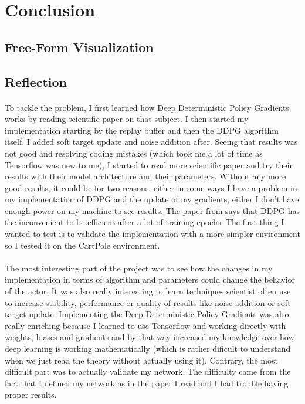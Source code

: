 \documentclass{article}
\begin{document}
\section{Conclusion}

\subsection{Free-Form Visualization}

\subsection{Reflection}

\paragraph{}
To tackle the problem, I first learned how Deep Deterministic Policy Gradients works by reading
scientific paper on that subject. I then started my implementation starting by the replay buffer
and then the DDPG algorithm itself. I added soft target update and noise addition after. Seeing
that results was not good and resolving coding mistakes (which took me a lot of time as Tensorflow
was new to me), I started to read more scientific paper and try their results with their model
architecture and their parameters. Without any more good results, it could be for two reasons:
either in some ways I have a problem in my implementation of DDPG and the update of my gradients,
either I don't have enough power on my machine to see results. The paper from
\citeauthor{journals/corr/LillicrapHPHETS15} says that DDPG has the inconvenient to be efficient
after a lot of training epochs. The first thing I wanted to test is to validate the implementation
with a more simpler environment so I tested it on the CartPole environment.

\paragraph{}
The most interesting part of the project was to see how the changes in my implementation in terms
of algorithm and parameters could change the behavior of the actor. It was also really interesting
to learn techniques scientist often use to increase stability, performance or quality of results
like noise addition or soft target update. Implementing the Deep Deterministic Policy Gradients
was also really enriching because I learned to use Tensorflow and working directly with weights,
biases and gradients and by that way increased my knowledge over how deep learning is working
mathematically (which is rather dificult to understand when we just read the theory without
actually using it). Contrary, the most difficult part was to actually validate my network. The
difficulty came from the fact that I defined my network as in the paper I read and I had trouble
having proper results. 
\end{document}
